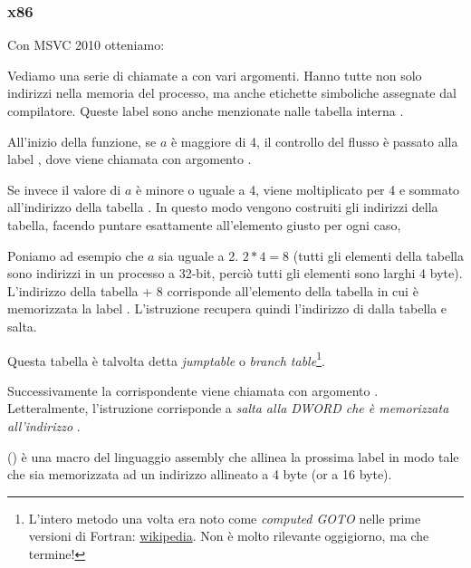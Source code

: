 \subsubsection{x86}


Con MSVC 2010 otteniamo:




Vediamo una serie di chiamate a \printf con vari argomenti. Hanno tutte non solo indirizzi nella memoria del processo, ma anche etichette
simboliche assegnate dal compilatore. Queste label sono anche menzionate nalle tabella interna .

All'inizio della funzione, se $a$ è maggiore di 4, il controllo del flusso è passato alla label 
, dove viene chiamata \printf con argomento .

Se invece il valore di $a$ è minore o uguale a 4, viene moltiplicato per 4 e sommato all'indirizzo della tabella . 
In questo modo vengono costruiti gli indirizzi della tabella, facendo puntare esattamente all'elemento giusto per ogni caso,

Poniamo ad esempio che $a$ sia uguale a 2. $2*4 = 8$ (tutti gli elementi della tabella sono indirizzi in un processo a 32-bit, perciò tutti gli elementi sono larghi 4 byte).
L'indirizzo della tabella  + 8 corrisponde all'elemento della tabella in cui è memorizzata la label .
L'istruzione \JMP recupera quindi l'indirizzo di  dalla tabella e salta.

Questa tabella è talvolta detta \emph{jumptable} o \emph{branch table}\footnote{L'intero metodo una volta era noto come 
\emph{computed GOTO} nelle prime versioni di Fortran:
\href{http://en.wikipedia.org/wiki/Branch_table}{wikipedia}.
Non è molto rilevante oggigiorno, ma che termine!}.

Successivamente la corrispondente \printf viene chiamata con argomento .\\
Letteralmente, l'istruzione  corrisponde a 
\emph{salta alla DWORD che è memorizzata all'indirizzo} .

 () è una macro del linguaggio assembly che allinea la prossima label in modo tale che sia memorizzata 
ad un indirizzo allineato a 4 byte (or a 16 byte).

